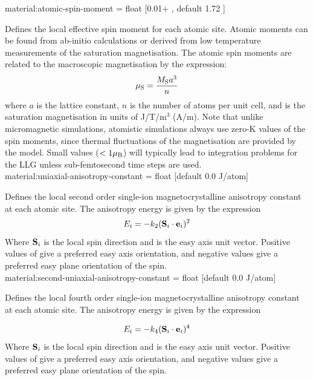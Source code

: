 {\zicf material:atomic-spin-moment = float [0.01+ \muB, default 1.72 \muB]}
Defines the local effective spin moment for each atomic site. Atomic moments can be found from ab-initio calculations or derived from low temperature measurements of the saturation magnetisation. The atomic spin moments are related to the macroscopic magnetisation by the expression:
\begin{equation*}
\mu_\mathrm{S} = \frac{M_\mathrm{S} a^3}{n}
\end{equation*}
where $a$ is the lattice constant, $n$ is the number of atoms per unit cell, and \Ms is the saturation magnetisation in units of J/T/m$^3$ (A/m). Note that unlike micromagnetic simulations, atomistic simulations always use zero-K values of the spin moments, since thermal fluctuations of the magnetisation are provided by the model. Small values ($<1 \mu_\mathrm{B}$) will typically lead to integration problems for the LLG unless sub-femtosecond time steps are used.\\

{\zicf material:uniaxial-anisotropy-constant = float [default 0.0 J/atom]}
  Defines the local second order single-ion magnetocrystalline anisotropy constant at each atomic site. The anisotropy energy is given by the expression
\begin{equation*}
E_i = -k_{2} (\mathbf{S}_i \cdot \mathbf{e}_i)^2
\end{equation*}
Where $\mathbf{S}_i$ is the local spin direction and \ei is the easy axis unit vector. Positive values of \kuu give a preferred easy axis orientation, and negative values give a preferred easy plane orientation of the spin.\\

{\zicf material:second-uniaxial-anisotropy-constant = float [default 0.0 J/atom]}
  Defines the local fourth order single-ion magnetocrystalline anisotropy constant at each atomic site. The anisotropy energy is given by the expression

\begin{equation*}
E_i = -k_{4} (\mathbf{S}_i \cdot \mathbf{e}_i)^4
\end{equation*}
Where $\mathbf{S}_i$ is the local spin direction and \ei is the easy axis unit vector. Positive values of \kuuuu give a preferred easy axis orientation, and negative values give a preferred easy plane orientation of the spin.\\

